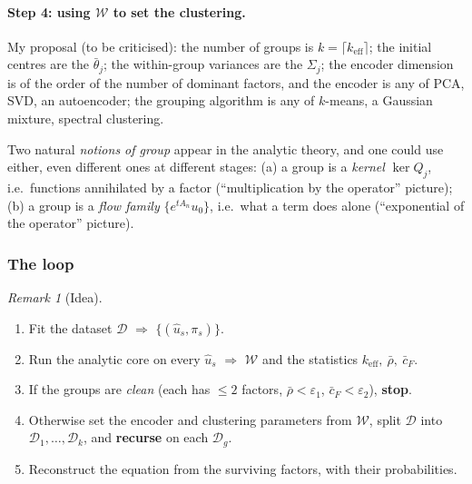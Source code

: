 \documentclass[11pt]{article}
\theoremstyle{plain}
\theoremstyle{definition}
\theoremstyle{remark}
\newtheorem{remark}[theorem]{Remark}
\newenvironment{ideabox}[1][]{\begin{remark}[Idea]}{\end{remark}}
\begin{document}
\paragraph{Step 4: using $\mathcal W$ to set the clustering.}
My proposal (to be criticised): the number of groups is $k=\lceil k_{\mathrm{eff}}\rceil$; the initial centres are the $\bar\theta_j$; the within-group variances are the $\Sigma_j$; the encoder dimension is of the order of the number of dominant factors, and the encoder is any of PCA, SVD, an autoencoder; the grouping algorithm is any of $k$-means, a Gaussian mixture, spectral clustering.

Two natural \emph{notions of group} appear in the analytic theory, and one could use either, even different ones at different stages: (a) a group is a \emph{kernel} $\ker Q_j$, i.e.\ functions annihilated by a factor (``multiplication by the operator'' picture); (b) a group is a \emph{flow family} $\{e^{tA_n}u_0\}$, i.e.\ what a term does alone (``exponential of the operator'' picture).

\subsubsection{The loop}\label{sec:loop}
\begin{ideabox}[title={Algorithm (outer loop)}]
\begin{enumerate}[nosep,leftmargin=*]
\item Fit the dataset $\mathcal D$ $\Rightarrow$ $\{(\hat u_s,\pi_s)\}$.
\item Run the analytic core on every $\hat u_s$ $\Rightarrow$ $\mathcal W$ and the statistics $k_{\mathrm{eff}},\ \bar\rho,\ \bar c_F$.
\item If the groups are \emph{clean} (each has $\le2$ factors, $\bar\rho<\varepsilon_1$, $\bar c_F<\varepsilon_2$), \textbf{stop}.
\item Otherwise set the encoder and clustering parameters from $\mathcal W$, split $\mathcal D$ into $\mathcal D_1,\dots,\mathcal D_k$, and \textbf{recurse} on each $\mathcal D_g$.
\item Reconstruct the equation from the surviving factors, with their probabilities.
\end{enumerate}
\end{ideabox}
\end{document}
